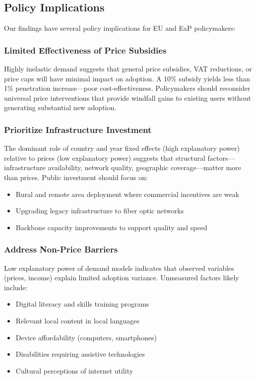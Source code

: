 \documentclass[12pt,review]{elsarticle}
\begin{document}
\subsection{Policy Implications}

Our findings have several policy implications for EU and EaP policymakers:

\subsubsection{Limited Effectiveness of Price Subsidies}

Highly inelastic demand suggests that general price subsidies, VAT reductions, or price caps will have minimal impact on adoption. A 10\% subsidy yields less than 1\% penetration increase---poor cost-effectiveness. Policymakers should reconsider universal price interventions that provide windfall gains to existing users without generating substantial new adoption.

\subsubsection{Prioritize Infrastructure Investment}

The dominant role of country and year fixed effects (high explanatory power) relative to prices (low explanatory power) suggests that structural factors---infrastructure availability, network quality, geographic coverage---matter more than prices. Public investment should focus on:
\begin{itemize}
\item Rural and remote area deployment where commercial incentives are weak
\item Upgrading legacy infrastructure to fiber optic networks
\item Backbone capacity improvements to support quality and speed
\end{itemize}

\subsubsection{Address Non-Price Barriers}

Low explanatory power of demand models indicates that observed variables (prices, income) explain limited adoption variance. Unmeasured factors likely include:
\begin{itemize}
\item Digital literacy and skills training programs
\item Relevant local content in local languages
\item Device affordability (computers, smartphones)
\item Disabilities requiring assistive technologies
\item Cultural perceptions of internet utility
\end{itemize}
\end{document}
